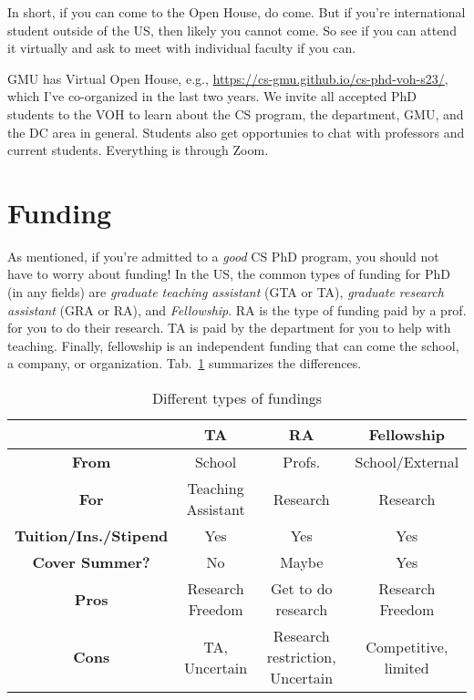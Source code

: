 \documentclass[10pt]{article}
\begin{document}
In short, if you can come to the Open House, do come.  But if you're international student outside of the US, then likely you cannot come.  So see if you can attend it virtually and ask to meet with individual faculty if you can.

\begin{tcolorbox}[left=1pt,right=1pt,top=1pt,bottom=1pt]
GMU has Virtual Open House, e.g., \url{https://cs-gmu.github.io/cs-phd-voh-s23/}, which I've co-organized in the last two years. We invite all accepted PhD students to the VOH to learn about the CS program, the department, GMU, and the DC area in general. Students also get opportunies to chat with professors and current students.  Everything is through Zoom.
\end{tcolorbox}



\section{Funding}

As mentioned, if you're admitted to a \emph{good} CS PhD program, you should not have to worry about funding!  
In the US, the common types of funding for PhD (in any fields) are \emph{graduate teaching assistant} (GTA or TA), \emph{graduate research assistant} (GRA or RA), and \emph{Fellowship}.
RA is the type of funding paid by a prof. for you to do their research. TA is paid by the department for you to help with teaching. Finally, fellowship is an independent funding that can come the school, a company, or organization. Tab.~\ref{tab:funding} summarizes the differences.

\begin{table}
  \centering
  \caption{Different types of fundings}\label{tab:funding}
  \begin{tabular}{c|c|c|c}
    \toprule
    &\textbf{TA}&\textbf{RA}&\textbf{Fellowship}\\
    \midrule
    \textbf{From} & School & Profs. & School/External\\
    \textbf{For}                  & Teaching Assistant       & Research                        & Research                              \\
    \textbf{Tuition/Ins./Stipend} & Yes                      & Yes                             & Yes                                   \\
    \textbf{Cover Summer?}              & No                       & Maybe                           & Yes                                   \\
    \midrule
    \textbf{Pros}                 & Research Freedom         & Get to do research              & Research Freedom                      \\
    \textbf{Cons}                 & TA, Uncertain            & Research restriction, Uncertain & Competitive, limited             \\
    \bottomrule
  \end{tabular}
\end{table}
\end{document}
